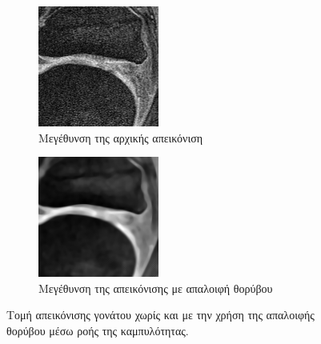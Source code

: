 \documentclass[a4paper,12pt]{article}
\begin{document}
\begin{figure}[H]
    \begin{subfigure}[t]{0.4\linewidth}
    \includegraphics[width=\linewidth]{original_1_1.png}
    \caption{Μεγέθυνση της αρχικής απεικόνιση}
    \end{subfigure}
    \begin{subfigure}[t]{0.4\linewidth}
    \includegraphics[width=\linewidth]{curvature_1_1.png}
    \caption{Μεγέθυνση της απεικόνισης με απαλοιφή θορύβου}
    \end{subfigure}

    \caption{Τομή απεικόνισης γονάτου χωρίς και με την χρήση της απαλοιφής
    θορύβου μέσω ροής της καμπυλότητας.}
    \label{fig:curvature_flow:1}
\end{figure}
\end{document}
